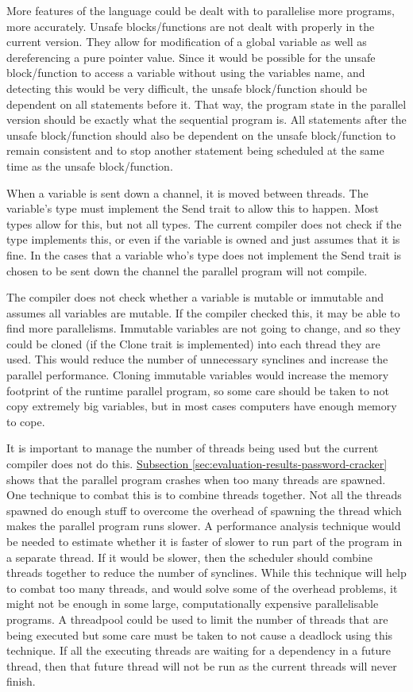 More features of the language could be dealt with to parallelise more programs, more accurately. Unsafe blocks/functions are not dealt with properly in the current version. They allow for modification of a global variable as well as dereferencing a pure pointer value. Since it would be possible for the unsafe block/function to access a variable without using the variables name, and detecting this would be very difficult, the unsafe block/function should be dependent on all statements before it. That way, the program state in the parallel version should be exactly what the sequential program is. All statements after the unsafe block/function should also be dependent on the unsafe block/function to remain consistent and to stop another statement being scheduled at the same time as the unsafe block/function.

When a variable is sent down a channel, it is moved between threads. The variable's type must implement the Send trait to allow this to happen. Most types allow for this, but not all types. The current compiler does not check if the type implements this, or even if the variable is owned and just assumes that it is fine. In the cases that a variable who's type does not implement the Send trait is chosen to be sent down the channel the parallel program will not compile.

The compiler does not check whether a variable is mutable or immutable and assumes all variables are mutable. If the compiler checked this, it may be able to find more parallelisms. Immutable variables are not going to change, and so they could be cloned (if the Clone trait is implemented) into each thread they are used. This would reduce the number of unnecessary synclines and increase the parallel performance. Cloning immutable variables would increase the memory footprint of the runtime parallel program, so some care should be taken to not copy extremely big variables, but in most cases computers have enough memory to cope.

It is important to manage the number of threads being used but the current compiler does not do this. \hyperref[sec:evaluation-results-password-cracker]{Subsection \ref{sec:evaluation-results-password-cracker}} shows that the parallel program crashes when too many threads are spawned. One technique to combat this is to combine threads together. Not all the threads spawned do enough stuff to overcome the overhead of spawning the thread which makes the parallel program runs slower. A performance analysis technique would be needed to estimate whether it is faster of slower to run part of the program in a separate thread. If it would be slower, then the scheduler should combine threads together to reduce the number of synclines. While this technique will help to combat too many threads, and would solve some of the overhead problems, it might not be enough in some large, computationally expensive parallelisable programs. A threadpool could be used to limit the number of threads that are being executed but some care must be taken to not cause a deadlock using this technique. If all the executing threads are waiting for a dependency in a future thread, then that future thread will not be run as the current threads will never finish.

